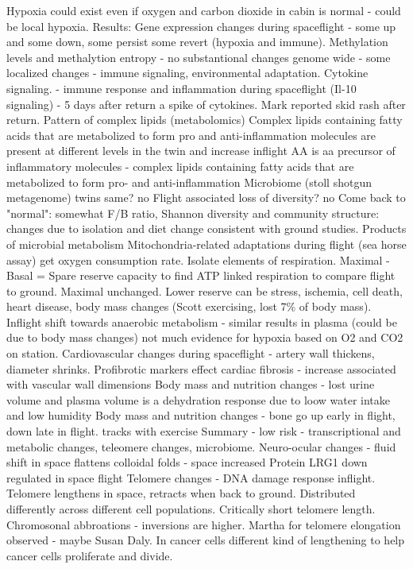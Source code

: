 \documentclass[a4paper, 11pt]{article}
\begin{document}
    Hypoxia could exist even if oxygen and carbon dioxide in cabin is normal - could be local hypoxia. 
    Results: Gene expression changes during spaceflight - some up and some down, some persist some revert (hypoxia and immune). Methylation levels and methalytion entropy - no substantional changes genome wide - some localized changes - immune signaling, environmental adaptation. 
    Cytokine signaling. - immune response and inflammation during spaceflight (Il-10 signaling)   - 5 days after return a spike of cytokines. Mark reported skid rash after return. 
    Pattern of complex lipids (metabolomics) Complex lipids containing fatty acids that are metabolized to form pro and anti-inflammation molecules are present at different levels in the twin and increase inflight 
    AA is aa precursor of inflammatory molecules - complex lipids containing fatty acids that are metabolized to form pro- and anti-inflammation
    Microbiome (stoll shotgun metagenome) twins same? no Flight associated loss of diversity? no Come back to "normal": somewhat 
    F/B ratio, Shannon diversity and community structure: changes due to isolation and diet change consistent with ground studies. 
    Products of microbial metabolism 
    Mitochondria-related adaptations during flight (sea horse assay) get oxygen consumption rate. Isolate elements of respiration. Maximal - Basal = Spare reserve capacity to find ATP linked respiration  to compare flight to ground.  Maximal unchanged. Lower reserve can be stress, ischemia, cell death, heart disease, body mass changes (Scott exercising, lost 7\% of body mass). 
    Inflight shift towards anaerobic metabolism - similar results in plasma (could be due to body mass changes) not much evidence for hypoxia based on O2 and CO2 on station. 
    Cardiovascular changes during spaceflight - artery wall thickens, diameter shrinks. Profibrotic markers effect cardiac fibrosis - increase associated with vascular wall dimensions
    Body mass and nutrition changes - lost urine volume and plasma volume is a dehydration response due to loow water intake and low humidity
    Body mass and nutrition changes - bone go up early in flight, down late in flight. tracks with exercise
    Summary - low risk - transcriptional and metabolic changes, teleomere changes, microbiome. 
    Neuro-ocular changes - fluid shift in space flattens colloidal folds - space increased Protein LRG1 down regulated in space flight 
    Telomere changes - DNA damage response inflight. Telomere lengthens in space, retracts when back to ground. Distributed differently across different cell populations. Critically short telomere length. Chromosonal abbroations - inversions are higher. Martha for telomere elongation observed - maybe Susan Daly. In cancer cells different kind of lengthening to help cancer cells proliferate and divide. 
    
\end{document}
